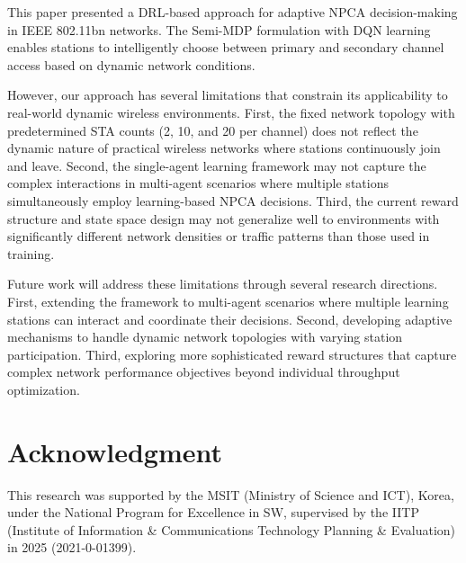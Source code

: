 \documentclass[conference]{IEEEtran}
\begin{document}
This paper presented a DRL-based approach for adaptive NPCA decision-making in IEEE 802.11bn networks. The Semi-MDP formulation with DQN learning enables stations to intelligently choose between primary and secondary channel access based on dynamic network conditions.


However, our approach has several limitations that constrain its applicability to real-world dynamic wireless environments. First, the fixed network topology with predetermined STA counts (2, 10, and 20 per channel) does not reflect the dynamic nature of practical wireless networks where stations continuously join and leave. Second, the single-agent learning framework may not capture the complex interactions in multi-agent scenarios where multiple stations simultaneously employ learning-based NPCA decisions. Third, the current reward structure and state space design may not generalize well to environments with significantly different network densities or traffic patterns than those used in training.

Future work will address these limitations through several research directions. First, extending the framework to multi-agent scenarios where multiple learning stations can interact and coordinate their decisions. Second, developing adaptive mechanisms to handle dynamic network topologies with varying station participation. Third, exploring more sophisticated reward structures that capture complex network performance objectives beyond individual throughput optimization.


\section*{Acknowledgment}

This research was supported by the MSIT (Ministry of Science and ICT), Korea, under the National Program for Excellence in SW, supervised by the IITP (Institute of Information \& Communications Technology Planning \& Evaluation) in 2025 (2021-0-01399).




\end{document}
